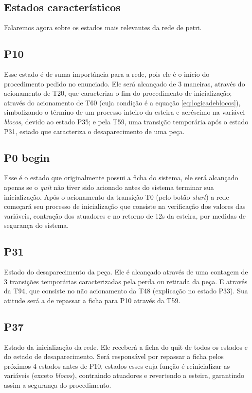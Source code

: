 \documentclass[a4paper,twoside]{articlewithlogo}
\begin{document}
\subsection{Estados característicos} Falaremos agora sobre os estados mais relevantes da rede de petri.

\subsection*{P10}Esse estado é de suma importância para a rede, pois ele é o início do procedimento pedido no enunciado. Ele será alcançado de 3 maneiras, através do acionamento de T20, que caracteriza o fim do procedimento de inicialização; através do acionamento de T60 (cuja condição é a equação \eqref{eq:logicadeblocos}), simbolizando o término de um processo inteiro da esteira e acréscimo na variável \textit{blocos}, devido ao estado P35; e pela T59, uma transição temporária após o estado P31, estado que caracteriza o desaparecimento de uma peça.

\subsection*{P0 begin} Esse é o estado que originalmente possui a ficha do sistema, ele será alcançado apenas se o \textit{quit} não tiver sido acionado antes do sistema terminar sua inicialização. Após o acionamento da transição T0 (pelo botão \textit{start}) a rede começará seu processo de inicialização que consiste na verificação dos valores das variáveis, contração dos atuadores e no retorno de 12s da esteira, por medidas de segurança do sistema.

\subsection*{P31} Estado do desaparecimento da peça. Ele é alcançado através de uma contagem de 3 transições temporárias caracterizadas pela perda ou retirada da peça. E através da T94, que consiste no não acionamento da T48 (explicação no estado P33).
Sua atitude será a de repassar a ficha para P10 através da T59.

\subsection*{P37} Estado da inicialização da rede. Ele receberá a ficha do quit de todos os estados e do estado de desaparecimento. Será responsável por repassar a ficha pelos próximos 4 estados antes de P10, estados esses cuja função é reinicializar as variáveis (exceto \textit{blocos}), contraindo atuadores e revertendo a esteira, garantindo assim a segurança do procedimento.
\end{document}
